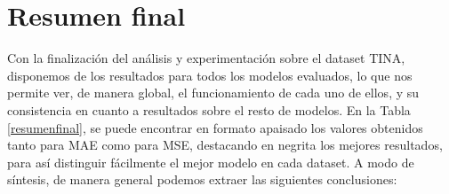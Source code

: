 \section{Resumen final}

Con la finalización del análisis y experimentación sobre el dataset TINA, disponemos de los resultados para todos los modelos evaluados, lo que nos permite ver, de manera global, el funcionamiento de cada uno de ellos, y su consistencia en cuanto a resultados sobre el resto de modelos. En la Tabla \ref{resumenfinal}, se puede encontrar en formato apaisado los valores obtenidos tanto para MAE como para MSE, destacando en negrita los mejores resultados, para así distinguir fácilmente el mejor modelo en cada dataset. A modo de síntesis, de manera general podemos extraer las siguientes conclusiones:

